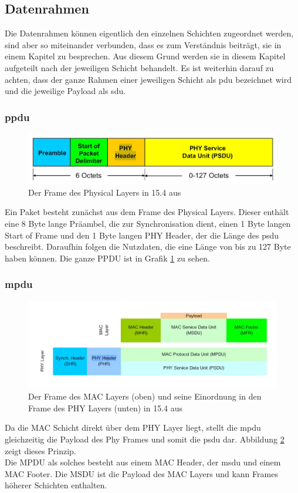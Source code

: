 \subsection{Datenrahmen}
Die Datenrahmen können eigentlich den einzelnen Schichten zugeordnet werden, sind aber so miteinander verbunden, dass es zum Verständnis beiträgt, sie in einem Kapitel zu besprechen. Aus diesem Grund werden sie in diesem Kapitel aufgeteilt nach der jeweiligen Schicht behandelt. Es ist weiterhin darauf zu achten, dass der ganze Rahmen einer jeweiligen Schicht als \ac{pdu} bezeichnet wird und die jeweilige Payload als \ac{sdu}.

\subsubsection{\ac{ppdu}}
\begin{figure}
	\centering
	\includegraphics[width=\textwidth]{Grafiken-Alex/ppdu.jpg}
	\caption{Der Frame des Physical Layers in 15.4 aus \cite{rubinstein}}
	\label{ppdu}
\end{figure}
Ein Paket besteht zunächst aus dem Frame des Physical Layers. Dieser enthält eine 8 Byte lange Präambel, die zur Synchronisation dient, einen 1 Byte langen Start of Frame und den 1 Byte langen PHY Header, der die Länge des \ac{psdu} beschreibt. Daraufhin folgen die Nutzdaten, die eine Länge von bis zu 127 Byte haben können. Die ganze PPDU ist in Grafik \ref{ppdu} zu sehen. 
\subsubsection{\ac{mpdu}}
\begin{figure}
	\centering
	\includegraphics[width=\textwidth]{Grafiken-Alex/mpdu.jpg}
	\caption{Der Frame des MAC Layers (oben) und seine Einordnung in den Frame des PHY Layers (unten) in 15.4 aus \cite{rubinstein}}
	\label{mpdu}
\end{figure}
Da die MAC Schicht direkt über dem PHY Layer liegt, stellt die \acf{mpdu} gleichzeitig die Payload des Phy Frames und somit die \acf{psdu} dar. Abbildung \ref{mpdu} zeigt dieses Prinzip. \\
Die MPDU als solches besteht aus einem MAC Header, der \acf{msdu} und einem MAC Footer. Die MSDU ist die Payload des MAC Layers und kann Frames höherer Schichten enthalten.


